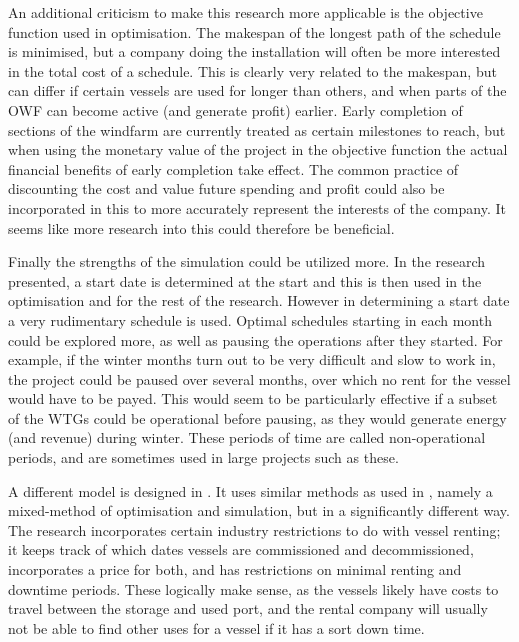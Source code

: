 \documentclass[a4paper,12pt]{article}
\begin{document}
An additional criticism to make this research more applicable is the objective function used in optimisation. The makespan of the longest path of the schedule is minimised, but a company doing the installation will often be more interested in the total cost of a schedule. This is clearly very related to the makespan, but can differ if certain vessels are used for longer than others, and when parts of the OWF can become active (and generate profit) earlier. Early completion of sections of the windfarm are currently treated as certain milestones to reach, but when using the monetary value of the project in the objective function the actual financial benefits of early completion take effect. The common practice of discounting the cost and value future spending and profit could also be incorporated in this to more accurately represent the interests of the company. It seems like more research into this could therefore be beneficial. 

Finally the strengths of the simulation could be utilized more. In the research presented, a start date is determined at the start and this is then used in the optimisation and for the rest of the research. However in determining a start date a very rudimentary schedule is used. Optimal schedules starting in each month could be explored more, as well as pausing the operations after they started. For example, if the winter months turn out to be very difficult and slow to work in, the project could be paused over several months, over which no rent for the vessel would have to be payed. This would seem to be particularly effective if a subset of the WTGs could be operational before pausing, as they would generate energy (and revenue) during winter. These periods of time are called non-operational periods, and are sometimes used in large projects such as these.  

\bigskip

A different model is designed in \cite{kerkhove2017optimised}. It uses similar methods as used in \cite{barlow2018mixed}, namely a mixed-method of optimisation and simulation, but in a significantly different way. The research incorporates certain industry restrictions to do with vessel renting; it keeps track of which dates vessels are commissioned and decommissioned, incorporates a price for both, and has restrictions on minimal renting and downtime periods. These logically make sense, as the vessels likely have costs to travel between the storage and used port, and the rental company will usually not be able to find other uses for a vessel if it has a sort down time. 
\end{document}
